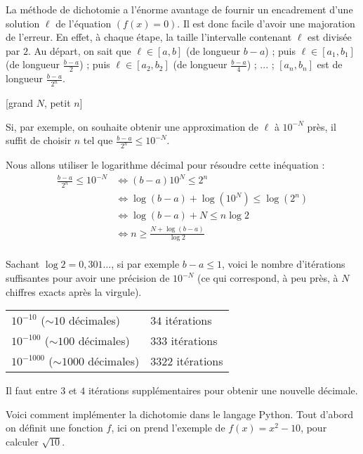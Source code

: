 La méthode de dichotomie a l'énorme avantage de fournir un encadrement d'une solution $\ell$ de l'équation $(f(x)=0)$. 
Il est donc facile d'avoir une majoration de l'erreur. En effet, à chaque étape, 
la taille l'intervalle contenant $\ell$ est divisée par $2$. 
Au départ, on sait que $\ell \in [a,b]$ (de longueur $b-a$) ;
puis $\ell  \in [a_1,b_1]$ (de longueur $\frac{b-a}{2}$) ; 
puis $\ell \in [a_2,b_2]$ (de longueur $\frac{b-a}{4}$) ; ... ;
$[a_n,b_n]$ est de longueur $\frac{b-a}{2^n}$.

\change

[grand $N$, petit $n$]

Si, par exemple, on souhaite obtenir une approximation de $\ell$ à $10^{-N}$ près, 
 il suffit de choisir $n$ tel que  $\frac{b-a}{2^n} \le 10^{-N}$.

Nous allons utiliser le logarithme décimal pour résoudre cette inéquation :
\begin{align*}
\frac{b-a}{2^n} \le 10^{-N} 
 & \iff (b-a)10^N \le 2^n  \\
 & \iff \log(b-a) + \log(10^N)  \le \log(2^n) \\
 & \iff \log(b-a) + N \le n \log 2 \\
 & \iff n \ge \frac{N +  \log(b-a)}{\log 2} \\
\end{align*}
  
\change

Sachant $\log 2 = 0,301\ldots$, si par exemple $b-a \le 1$, 
voici le nombre d'itérations suffisantes pour avoir une 
précision de $10^{-N}$ 
(ce qui correspond, à peu près, à $N$ chiffres exacts après la virgule).
\begin{center}
\begin{tabular}{ll}
  $10^{-10}$ ($\sim 10$ décimales) &  $34$ itérations \\
  $10^{-100}$ ($\sim 100$ décimales) &  $333$ itérations \\ 
  $10^{-1000}$ ($\sim 1000$ décimales) &  $3322$ itérations \\ 
\end{tabular}  
\end{center}

Il faut entre $3$ et $4$ itérations supplémentaires pour obtenir une nouvelle décimale.
 


\diapo

Voici comment implémenter la dichotomie dans le langage Python. Tout d'abord 
on définit une fonction $f$, ici on prend l'exemple de $f(x)=x^2-10$, pour calculer $\sqrt{10}$.


